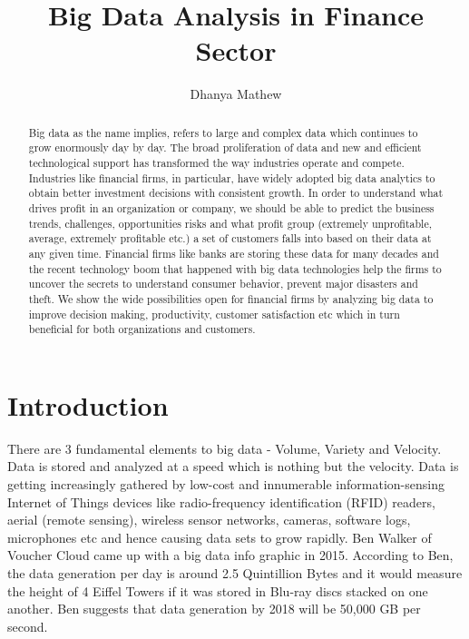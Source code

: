 \documentclass[sigconf]{acmart}
\begin{document}
\title{Big Data Analysis in Finance Sector}


\author{Dhanya Mathew}

\renewcommand{\shortauthors}{B. Trovato et al.}


\begin{abstract}

Big data as the name implies, refers to large and complex data which continues to grow enormously day by day. The broad proliferation of data and new and efficient technological support has transformed the way industries operate and compete. Industries like financial firms, in particular, have widely adopted big data analytics to obtain better investment decisions with consistent growth. In order to understand what drives profit in an organization or company, we should be able to predict the business trends, challenges, opportunities risks and what profit group (extremely unprofitable, average, extremely profitable etc.) a set of customers falls into based on their data at any given time. Financial firms like banks are storing these data for many decades and the recent technology boom that happened with big data technologies help the firms to uncover the secrets to understand consumer behavior, prevent major disasters and theft. We show the wide possibilities open for financial firms by analyzing big data to improve decision making, productivity, customer satisfaction etc which in turn beneficial for both organizations and customers.
\end{abstract}



\maketitle

\section{Introduction}

There are 3 fundamental elements to big data - Volume, Variety and Velocity. Data is stored and analyzed at a speed which is nothing but the velocity\cite{how-big-data-has-changed-finance}. Data is getting increasingly gathered by low-cost and innumerable information-sensing Internet of Things devices like radio-frequency identification (RFID) readers, aerial (remote sensing), wireless sensor networks, cameras, software logs, microphones etc and hence causing data sets to grow rapidly\cite{wiki-bigdata}. Ben Walker of Voucher Cloud came up with a big data info graphic in 2015. According to Ben, the data generation per day is around 2.5 Quintillion Bytes and it would measure the height of 4 Eiffel Towers if it was stored in Blu-ray discs stacked on one another. Ben suggests that data generation by 2018 will be 50,000 GB per second\cite{how-much-data-is-created-daily}. 
\end{document}
